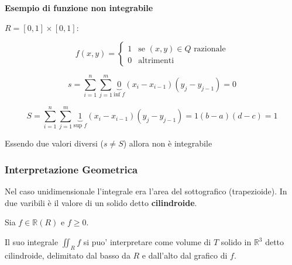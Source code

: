 \documentclass[../appunti-analisi.tex]{subfiles}
\begin{document}

\textbf{Esempio di funzione non integrabile} 

$R = [0,1] \times [0,1]$:

\[
    f(x,y) = \begin{cases}
        1 & \text{se $(x,y) \in Q$ razionale} \\
         0& \text{altrimenti}
    \end{cases}
\]

\[
    s = \sum^{n}_{i=1} \sum^{m}_{j=1} \underbrace{0}_\text{inf $f$} (x_i - x_{i-1})(y_j - y_{j-1}) = 0
\]


\[
    S = \sum^{n}_{i=1} \sum^{m}_{j=1} \underbrace{1}_\text{sup $f$} (x_i - x_{i-1})(y_j - y_{j-1}) = 1 (b-a) (d-c) = 1
\]

Essendo due valori diversi ($s \neq S$) allora non è integrabile

\subsubsection{Interpretazione Geometrica}

Nel caso unidimensionale l'integrale era l'area del sottografico (trapezioide). In due varibili è il valore di un solido detto \textbf{cilindroide}.

Sia $f \in \mathbb{R}(R)$ e $f \ge 0$.

Il suo integrale $\iint_R {f}$ si puo' interpretare come volume di $T$ solido in $\mathbb{R}^{3}$ detto cilindroide, delimitato dal basso da $R$ e dall'alto dal grafico di $f$.
\end{document}
